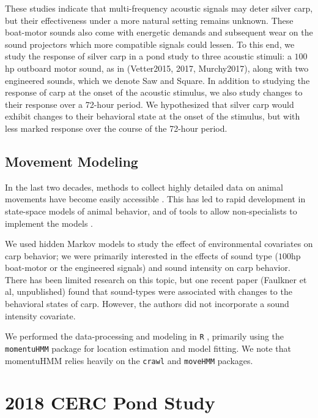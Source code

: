 \documentclass[12pt]{article}
\begin{document}
	These studies indicate that multi-frequency acoustic signals may deter silver carp, but their effectiveness under a more natural setting remains unknown. These boat-motor sounds also come with energetic demands and subsequent wear on the sound projectors which more compatible signals could lessen. To this end, we study the response of silver carp in a pond study to three acoustic stimuli: a $100$hp outboard motor sound, as in (Vetter2015, 2017, Murchy2017), along with two engineered sounds, which we denote Saw and Square. In addition to studying the response of carp at the onset of the acoustic stimulus, we also study changes to their response over a 72-hour period. We hypothesized that silver carp would exhibit changes to their behavioral state at the onset of the stimulus, but with less marked response over the course of the 72-hour period.

	\subsection{Movement Modeling}
	
	In the last two decades, methods to collect highly detailed data on animal movements have become easily accessible \cite{McConnell2010, Tomkiewicz2010}. This has led to rapid development in state-space models of animal behavior, and of tools to allow non-specialists to implement the models \cite{Johnson2008, McClintock2012, Michelot2016, Whoriskey2017, McClintock2018}.
	
	We used hidden Markov models to study the effect of environmental covariates on carp behavior; we were primarily interested in the effects of sound type ($100$hp boat-motor or the engineered signals) and sound intensity on carp behavior. There has been limited research on this topic, but one recent paper (Faulkner et al, unpublished) found that sound-types were associated with changes to the behavioral states of carp. However, the authors did not incorporate a sound intensity covariate.
	
	We performed the data-processing and modeling in \texttt{R} \cite{Rlang2022}, primarily using the \texttt{momentuHMM} package \cite{McClintock2018} for location estimation and model fitting. We note that momentuHMM relies heavily on the \texttt{crawl} \cite{crawl} and \texttt{moveHMM} \cite{Michelot2016} packages.

\section{2018 CERC Pond Study}
\end{document}
